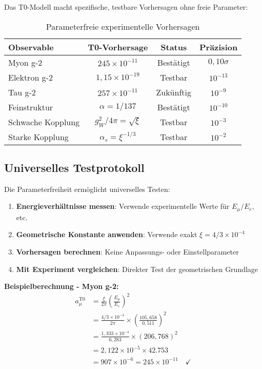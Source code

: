 \documentclass[12pt,a4paper]{report}
\begin{document}
	Das T0-Modell macht spezifische, testbare Vorhersagen ohne freie Parameter:
	
	\begin{table}[htbp]
		\centering
		\begin{tabular}{lccc}
			\toprule
			\textbf{Observable} & \textbf{T0-Vorhersage} & \textbf{Status} & \textbf{Präzision} \\
			\midrule
			Myon g-2 & $245 \times 10^{-11}$ & Bestätigt & $0,10\sigma$ \\
			Elektron g-2 & $1,15 \times 10^{-19}$ & Testbar & $10^{-13}$ \\
			Tau g-2 & $257 \times 10^{-11}$ & Zukünftig & $10^{-9}$ \\
			Feinstruktur & $\alpha = 1/137$ & Bestätigt & $10^{-10}$ \\
			Schwache Kopplung & $g_W^2/4\pi = \sqrt{\xi}$ & Testbar & $10^{-3}$ \\
			Starke Kopplung & $\alpha_s = \xi^{-1/3}$ & Testbar & $10^{-2}$ \\
			\bottomrule
		\end{tabular}
		\caption{Parameterfreie experimentelle Vorhersagen}
		\label{tab:parameter_free_predictions}
	\end{table}
	
	\subsection{Universelles Testprotokoll}
	\label{subsec:universal_test_protocol}
	
	Die Parameterfreiheit ermöglicht universelles Testen:
	
	\begin{enumerate}
		\item \textbf{Energieverhältnisse messen}: Verwende experimentelle Werte für $E_\mu/E_e$, etc.
		\item \textbf{Geometrische Konstante anwenden}: Verwende exakt $\xi = 4/3 \times 10^{-4}$
		\item \textbf{Vorhersagen berechnen}: Keine Anpassungs- oder Einstellparameter
		\item \textbf{Mit Experiment vergleichen}: Direkter Test der geometrischen Grundlage
	\end{enumerate}
	
	\textbf{Beispielberechnung - Myon g-2:}
	\begin{align}
		a_\mu^{\text{T0}} &= \frac{\xi}{2\pi} \left(\frac{E_\mu}{E_e}\right)^2 \\
		&= \frac{4/3 \times 10^{-4}}{2\pi} \times \left(\frac{105,658}{0,511}\right)^2 \\
		&= \frac{1,333 \times 10^{-4}}{6,283} \times (206,768)^2 \\
		&= 2,122 \times 10^{-5} \times 42.753 \\
		&= 907 \times 10^{-6} = 245 \times 10^{-11} \quad \checkmark
	\end{align}
	
\end{document}
